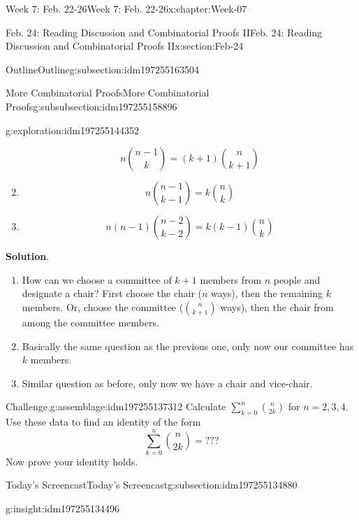 \documentclass[oneside,10pt,]{book}
\newcommand{\blocktitlefont}{\relax}
\numberwithin{equation}{section}
\newlength{\qrsize}
\newlength{\previewwidth}
\begin{document}
\begin{chapterptx}{Week 7: Feb. 22-26}{}{Week 7: Feb. 22-26}{}{}{x:chapter:Week-07}
\begin{sectionptx}{Feb. 24: Reading Discussion and Combinatorial Proofs II}{}{Feb. 24: Reading Discussion and Combinatorial Proofs II}{}{}{x:section:Feb-24}
\begin{subsectionptx}{Outline}{}{Outline}{}{}{g:subsection:idm197255163504}
\begin{subsubsectionptx}{More Combinatorial Proofs}{}{More Combinatorial Proofs}{}{}{g:subsubsection:idm197255158896}
\begin{exploration}{}{g:exploration:idm197255144352}
\begin{enumerate}
\begin{equation*}
n\binom{n-1}{k} = (k+1) \binom{n}{k+1}
\end{equation*}
%
\item{}%
\begin{equation*}
n\binom{n-1}{k-1} = k\binom{n}{k}
\end{equation*}
%
\item{}%
\begin{equation*}
n(n-1)\binom{n-2}{k-2} = k(k-1)\binom{n}{k}
\end{equation*}
%
\end{enumerate}
\par\smallskip%
\noindent\textbf{\blocktitlefont Solution}.\hypertarget{g:solution:idm197255141072}{}\quad{}%
\begin{enumerate}
\item{}How can we choose a committee of \(k+1\) members from \(n\) people and designate a chair? First choose the chair (\(n\) ways), then the remaining \(k\) members. Or, choose the committee (\(\binom{n}{k+1}\) ways), then the chair from among the committee members.%
\item{}Basically the same question as the previous one, only now our committee has \(k\) members.%
\item{}Similar question as before, only now we have a chair and vice-chair.%
\end{enumerate}
\end{exploration}%
\begin{assemblage}{Challenge.}{g:assemblage:idm197255137312}%
Calculate \(\sum_{k=0}^n \binom{n}{2k}\) for \(n=2,3,4\). Use these data to find an identity of the form%
\begin{equation*}
\sum\limits_{k=0}^n \binom{n}{2k} = ???
\end{equation*}
Now prove your identity holds.%
\end{assemblage}
\end{subsubsectionptx}
\end{subsectionptx}
%
%
\typeout{************************************************}
\typeout{************************************************}
%
\begin{subsectionptx}{Today's Screencast}{}{Today's Screencast}{}{}{g:subsection:idm197255134880}
\begin{insight}{}{g:insight:idm197255134496}%
\setlength{\qrsize}{9em}
\setlength{\previewwidth}{\linewidth}
\addtolength{\previewwidth}{-\qrsize}
\begin{tcbraster}[raster columns=2, raster column skip=1pt, raster halign=center, raster force size=false, raster left skip=0pt, raster right skip=0pt]%

\end{tcbraster}
\end{insight}
\end{subsectionptx}
\end{sectionptx}
\end{chapterptx}
\end{document}
